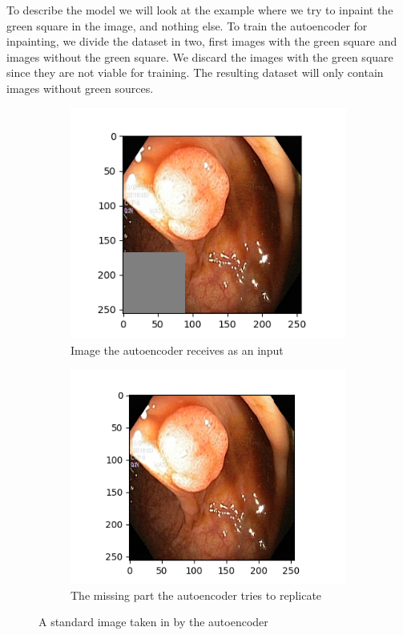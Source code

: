 To describe the model we will look at the example where we try to inpaint the green square in the image, and nothing else.
To train the autoencoder for inpainting, we divide the dataset in two, first images with the green square and images without the green square. We discard the images with the green square since they are not viable for training.  The resulting dataset will only contain images without green sources. 
\begin{figure}[]
\centering
\begin{subfigure}[b]{0.45\textwidth}
    \centering
    \includegraphics[width=\textwidth]{methodology/figures/masked_img.png}
    \caption{Image the autoencoder receives as an input }    
    \label{fig:AErec}
\end{subfigure}
\hfill
\begin{subfigure}[b]{0.49\textwidth}  
    \centering 
    \includegraphics[width=\textwidth]{methodology/figures/whole_img.png}
    \caption[Hate to be this guy]%
    {{\small The missing part the autoencoder tries to replicate}}    
    \label{fig:AErep}
\end{subfigure}
\caption{A standard image taken in by the autoencoder} 
\label{fig:AEmasks}
\end{figure}

